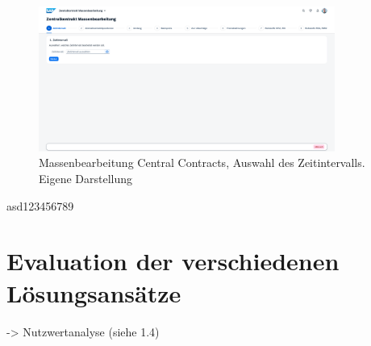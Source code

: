\begin{figure}[H]
    \centering
    \includegraphics[height=4.76cm]{Bilder/Praxisteil-KL-Schritt-1.png}
    \caption[Massenbearbeitung Central Contracts, Auswahl des Zeitintervalls]{Massenbearbeitung Central Contracts, Auswahl des Zeitintervalls. Eigene Darstellung}
    \label{fig:Central_Contract_Process3}
\end{figure}

asd123456789


\section{Evaluation der verschiedenen Lösungsansätze}

-> Nutzwertanalyse (siehe 1.4)
